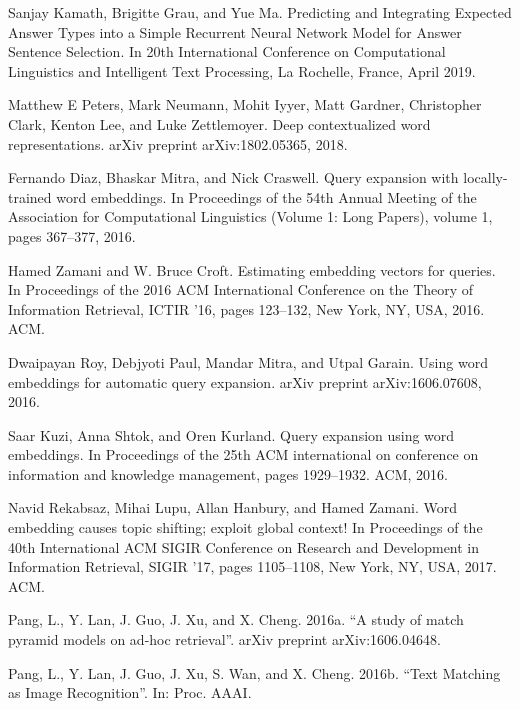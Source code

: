 \documentclass{llncs}
\begin{document}
\begin{thebibliography}{}
 Sanjay Kamath, Brigitte Grau, and Yue Ma. Predicting and Integrating Expected Answer Types into a Simple Recurrent Neural Network Model for Answer Sentence Selection. In 20th International Conference on Computational Linguistics and Intelligent Text Processing, La Rochelle, France, April 2019. 

  Matthew E Peters, Mark Neumann, Mohit Iyyer, Matt Gardner, Christopher Clark, Kenton Lee, and Luke Zettlemoyer. Deep contextualized word representations. arXiv preprint arXiv:1802.05365, 2018. 

 Fernando Diaz, Bhaskar Mitra, and Nick Craswell. Query expansion with locally-trained word embeddings. In Proceedings of the 54th Annual Meeting of the Association for Computational Linguistics (Volume 1: Long Papers), volume 1, pages 367–377, 2016.

 Hamed Zamani and W. Bruce Croft. Estimating embedding vectors for queries. In Proceedings of the 2016 ACM International Conference on the Theory of Information Retrieval, ICTIR ’16, pages 123–132, New York, NY, USA, 2016. ACM.

 Dwaipayan Roy, Debjyoti Paul, Mandar Mitra, and Utpal Garain. Using word embeddings for automatic query expansion. arXiv preprint arXiv:1606.07608, 2016.

 Saar Kuzi, Anna Shtok, and Oren Kurland. Query expansion using word embeddings. In Proceedings of the 25th ACM international on conference on information and knowledge management, pages 1929–1932. ACM, 2016.

 Navid Rekabsaz, Mihai Lupu, Allan Hanbury, and Hamed Zamani. Word embedding causes topic shifting; exploit global context! In Proceedings of the 40th International ACM SIGIR Conference on Research and Development in Information Retrieval, SIGIR ’17, pages 1105–1108, New York, NY, USA, 2017. ACM.

 Pang, L., Y. Lan, J. Guo, J. Xu, and X. Cheng. 2016a. “A study of match pyramid models on ad-hoc retrieval”. arXiv preprint arXiv:1606.04648.

 Pang, L., Y. Lan, J. Guo, J. Xu, S. Wan, and X. Cheng. 2016b. “Text Matching as Image Recognition”. In: Proc. AAAI.


\end{thebibliography}
\clearpage
\clearpage
%
\end{document}

